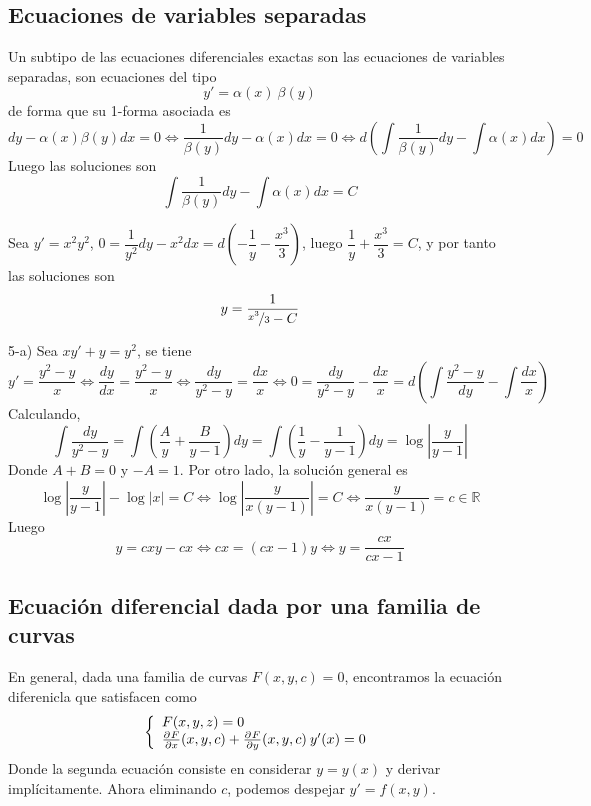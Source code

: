 \subsection{Ecuaciones de variables separadas}
Un subtipo de las ecuaciones diferenciales exactas son las ecuaciones de variables separadas, son ecuaciones del tipo $$y'=\alpha(x) \: \beta(y)$$ de forma que su 1-forma asociada es 
$$dy-\alpha(x) \beta(y)dx=0 \iff \dfrac{1}{\beta(y)}dy-\alpha(x)dx =0 \iff d\left(\int \dfrac{1}{\beta(y)}dy - \int \alpha(x)dx  \right)=0$$
Luego las soluciones son $$\int \dfrac{1}{\beta(y)}dy - \int \alpha(x)dx =C$$
\begin{eje}
    Sea $y'=x^2y^2$, $0=\dfrac{1}{y^2}dy - x^2dx=d\left( -\dfrac{1}{y}- \dfrac{x^3}{3}\right)$, luego $\dfrac{1}{y}+\dfrac{x
^3}{3}=C$, y por tanto las soluciones son 
$$y =\dfrac{1}{\nicefrac{x^3}{3}-C}$$
\end{eje}
\begin{ejer}
    5-a) Sea $xy'+y=y^2$, se tiene 
    $$y'=\dfrac{y^2-y}{x} \iff \dfrac{dy}{dx}=\dfrac{y^2-y}{x} \iff \dfrac{dy}{y^2-y}=\dfrac{dx}{x} \iff 0=\dfrac{dy}{y^2-y}-\dfrac{dx}{x}=d\left( \int\dfrac{y^2-y}{dy}-\int{\dfrac{dx}{x}}\right)
    $$
    Calculando, 
    $$\int \dfrac{dy}{y^2-y}=\int \left( \dfrac{A}{y}+\dfrac{B}{y-1}\right)dy=\int \left( \dfrac{1}{y} - \dfrac{1}{y-1}\right)dy=\log \left| \dfrac{y}{y-1}\right|$$
    Donde $A+B=0$ y $-A=1$. Por otro lado, la solución general es
    $$\log \left| \dfrac{y}{y-1}\right|-\log|x|=C \iff \log \left| \dfrac{y}{x(y-1)}\right|=C \iff \dfrac{y}{x(y-1)}=c \in \mathbb R$$
    Luego $$y=cxy-cx \iff cx=(cx-1)y \iff y=\dfrac{cx}{cx-1}$$
\end{ejer}
\subsection{Ecuación diferencial dada por una familia de curvas}
En general, dada una familia de curvas $F(x,y,c)=0$, encontramos la ecuación diferenicla que satisfacen como 
$$\left\{\begin{array}{l}
     F(x,y,z)=0  \\
     \frac{\partial^{} F}{\partial x}(x,y,c)+\frac{\partial^{} F}{\partial y}(x,y,c)\: y'(x)=0 
\end{array} \right.$$
Donde la segunda ecuación consiste en considerar $y=y(x)$ y derivar implícitamente. Ahora eliminando $c$, podemos despejar $y'=f(x,y)$.


